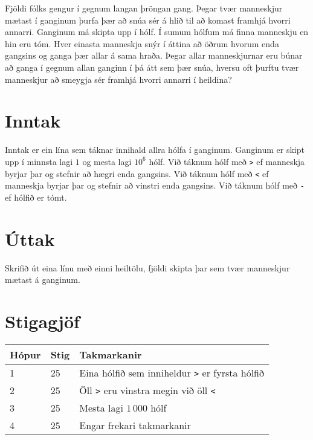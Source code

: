 %
Fjöldi fólks gengur í gegnum langan þröngan gang.
Þegar tvær manneskjur mætast í ganginum þurfa þær að snúa sér á hlið til að komast framhjá hvorri annarri.
Ganginum má skipta upp í hólf.
Í sumum hólfum má finna manneskju en hin eru tóm.
Hver einasta manneskja snýr í áttina að öðrum hvorum enda gangsins og ganga þær allar á sama hraða.
Þegar allar manneskjurnar eru búnar að ganga í gegnum allan ganginn í þá átt sem þær snúa,
hversu oft þurftu tvær manneskjur að smeygja sér framhjá hvorri annarri í heildina?

\section*{Inntak}
Inntak er ein lína sem táknar innihald allra hólfa í ganginum.
Ganginum er skipt upp í minnsta lagi $1$ og mesta lagi $10^6$ hólf.
Við táknum hólf með \texttt{>} ef manneskja byrjar þar og stefnir að hægri enda gangsins.
Við táknum hólf með \texttt{<} ef manneskja byrjar þar og stefnir að vinstri enda gangsins.
Við táknum hólf með \texttt{-} ef hólfið er tómt.

\section*{Úttak}
Skrifið út eina línu með einni heiltölu, fjöldi skipta þar sem tvær manneskjur mætast á ganginum.

\section*{Stigagjöf}
\begin{tabular}{|l|l|l|}
\hline
Hópur & Stig & Takmarkanir \\ \hline
1     & 25  & Eina hólfið sem inniheldur \texttt{>} er fyrsta hólfið \\ \hline
2     & 25  & Öll \texttt{>} eru vinstra megin við öll \texttt{<} \\ \hline
3     & 25  & Mesta lagi $1\,000$ hólf \\ \hline
4     & 25  & Engar frekari takmarkanir \\ \hline
\end{tabular}
